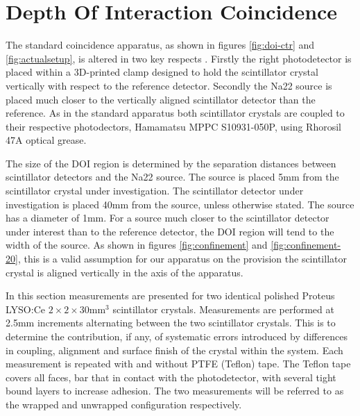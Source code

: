 \section{Depth Of Interaction Coincidence}
The standard coincidence apparatus, as shown in figures \ref{fig:doi-ctr} and \ref{fig:actualsetup}, is altered in two key respects . Firstly the right photodetector is placed within a 3D-printed clamp designed to hold the scintillator crystal vertically with respect to the reference detector. Secondly the Na22 source is placed much closer to the vertically aligned scintillator detector than the reference. As in the standard apparatus both scintillator crystals are coupled to their respective photodectors, Hamamatsu MPPC S10931-050P, using Rhorosil 47A optical grease. 

The size of the DOI region is determined by the separation distances between scintillator detectors and the Na22 source.  The source is placed 5mm from the scintillator crystal under investigation. The scintillator detector under investigation is placed 40mm from the source, unless otherwise stated. The source has a diameter of 1mm. For a source much closer to the scintillator detector under interest than to the reference detector, the DOI region will tend to the width of the source. As shown in figures \ref{fig:confinement} and \ref{fig:confinement-20}, this is a valid assumption for our apparatus on the provision the scintillator crystal is aligned vertically in the axis of the apparatus.

In this section measurements are presented for two identical polished Proteus LYSO:Ce $2\times2\times30$mm$^3$ scintillator crystals. Measurements are performed at 2.5mm increments alternating between the two scintillator crystals. This is to determine the contribution, if any, of systematic errors introduced by differences in coupling, alignment and surface finish of the crystal within the system. Each measurement is repeated with and without PTFE (Teflon) tape. The Teflon tape covers all faces, bar that in contact with the photodetector, with several tight bound layers to increase adhesion. The two measurements will be referred to as the wrapped and unwrapped configuration respectively.

